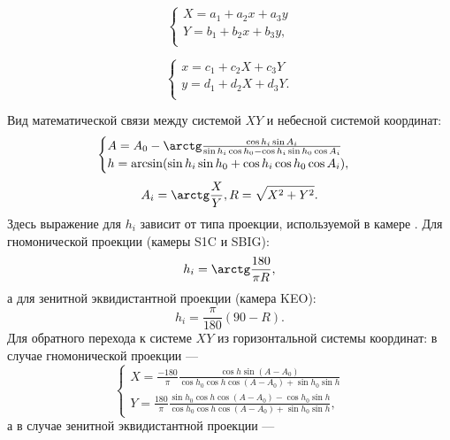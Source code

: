 \documentclass[12pt,a4paper]{article}
\begin{document}
\begin{equation}\label{eq:eq1}
\begin{cases}
X = a_1 + a_2 x +a_3 y\\
Y = b_1 + b_2 x +b_3 y,\\
\end{cases}
\end{equation}

\begin{equation}\label{eq:eq2}
\begin{cases}
x = c_1 + c_2 X +c_3 Y\\
y = d_1 + d_2 X +d_3 Y.\\
\end{cases}
\end{equation}

Вид математической связи между системой $XY$ и небесной системой координат:
\begin{equation}\label{eq:eq3}
\begin{cases}
A = A_0 - \arctg\frac{\cos h_i\sin A_i}{\sin h_i \cos h_0 -\cos h_i \sin h_0 \cos A_i}\\
h = \arcsin (\sin h_i \sin h_0 + \cos h_i \cos h_0 \cos A_i),
\end{cases}
\end{equation}
\begin{equation}\label{eq:eq5}
A_i = \arctg\frac{X}{Y}, R = \sqrt{X^2 + Y^2}.
\end{equation} 
Здесь выражение для $h_i$ зависит от типа проекции, используемой в камере \cite{Calabretta2002}. Для гномонической проекции (камеры S1C и SBIG): 
\begin{equation}\label{eq:eq7}
h_i = \arctg\frac{180}{\pi R},
\end{equation}
а для зенитной эквидистантной проекции (камера KEO): 
\begin{equation}\label{eq:eq8}
h_i = \frac{\pi}{180}(90-R).
\end{equation}
Для обратного перехода к системе $XY$ из горизонтальной системы координат: в случае гномонической проекции ---
\begin{equation}\label{eq:eq8_dop}
\begin{cases}
X=\frac{-180}{\pi}\frac{\cos{h}\sin{(A-A_0)}}{\cos{h_0}\cos{h}\cos{(A-A_0)}+\sin{h_0}\sin{h}}\\
Y=\frac{180}{\pi}
\frac{\sin{h_0}\cos{h}\cos{(A-A_0)}-\cos{h_0}\sin{h}}
{\cos{h_0}\cos{h}\cos{(A-A_0)}+\sin{h_0}\sin{h}},
\end{cases}
\end{equation}
а в случае зенитной эквидистантной проекции ---
\end{document}
